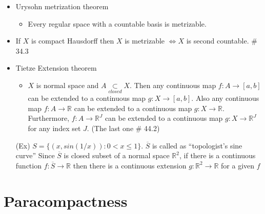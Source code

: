 \documentclass[12pt]{article}
\newcommand{\Real}{\mathbb{R}}
\newcommand{\closed}{\underset{closed}{\subset}}
\newcommand{\cl}{\overline}
\begin{document}
\begin{itemize}
	\item Urysohn metrization theorem
	\begin{itemize}
		\item Every regular space with a countable basis is metrizable.
	\end{itemize}
	\item If $X$ is compact Hausdorff then $X$ is metrizable $\Leftrightarrow X$ is second countable. \quad \# 34.3
	\item Tietze Extension theorem
	\begin{itemize}
		\item $X$ is normal space and $A\closed X$. Then any continuous map $f: A\rightarrow[a,b]$ can be extended to a continuous map $g: X\rightarrow [a,b]$. Also any continuous map $f: A\rightarrow \Real$ can be extended to a continuous map $g: X\rightarrow \Real$. \\ Furthermore, $f : A\rightarrow \Real^J$ can be extended to a continuous map $g: X\rightarrow \Real^J$ for any index set $J$. (The last one \# 44.2)
	\end{itemize}
	\item[(Ex)] $S=\{(x, sin(1/x)): 0<x\leq 1\}$. $\cl{S}$ is called as ``topologist's sine curve'' Since $\cl{S}$ is closed subset of a normal space $\Real^2$, if there is a continuous function $f : \cl{S}\rightarrow \Real$ then there is a continuous extension $g : \Real^2\rightarrow \Real$ for a given $f$
\end{itemize}
\clearpage

\section{Paracompactness}
\bigskip
\end{document}
